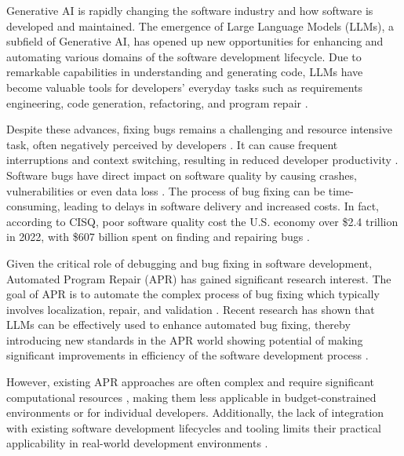 Generative AI is rapidly changing the software industry and how software is developed and maintained. The emergence of Large Language Models (LLMs), a subfield of Generative AI, has opened up new opportunities for enhancing and automating various domains of the software development lifecycle. Due to remarkable capabilities in understanding and generating code, LLMs have become valuable tools for developers' everyday tasks such as requirements engineering, code generation, refactoring, and program repair \cite{houLargeLanguageModels2024, puvvadiCodingAgentsComprehensive2025}.

Despite these advances, fixing bugs remains a challenging and resource intensive task, often negatively perceived by developers  \cite{winterHowDevelopersReally2023}. It can cause frequent interruptions and context switching, resulting in reduced developer productivity  \cite{vasilescuSkyNotLimit2016}.
Software bugs have direct impact on software quality by causing crashes, vulnerabilities or even data loss \cite{tihanyiNewEraSoftware2024}.
The process of bug fixing can be time-consuming, leading to delays in software delivery and increased costs. %
In fact, according to CISQ, poor software quality cost the U.S. economy over \$2.4 trillion in 2022, with \$607 billion spent on finding and repairing bugs \cite{CostPoorSoftware}.

Given the critical role of debugging and bug fixing in software development, Automated Program Repair (APR) has gained significant research interest. The goal of APR is to automate the complex process of bug fixing \cite{houLargeLanguageModels2024} which typically involves localization, repair, and validation \cite{zhangEmpiricalStudyFactors2012, leeUnifiedDebuggingApproach2024,xiaAgentlessDemystifyingLLMbased2024,zhangPATCHEmpoweringLarge2025, wangEmpiricalResearchUtilizing2025}.
Recent research has shown that LLMs can be effectively used to enhance automated bug fixing, thereby introducing new standards in the APR world showing potential of making significant improvements in efficiency of the software development process \cite{xiaAgentlessDemystifyingLLMbased2024,liuMarsCodeAgentAInative2024,yangSWEagentAgentComputerInterfaces2024, sobaniaAnalysisAutomaticBug2023, xiaAutomatedProgramRepair2024, huCanGPTO1Kill2024}.

However, existing APR approaches are often complex and require significant computational resources \cite{rondonEvaluatingAgentbasedProgram2025}, making them less applicable in budget-constrained environments or for individual developers. Additionally, the lack of integration with existing software development lifecycles and tooling limits their practical applicability in real-world development environments \cite{chenUnveilingPitfallsUnderstanding2025,liuMarsCodeAgentAInative2024}.

